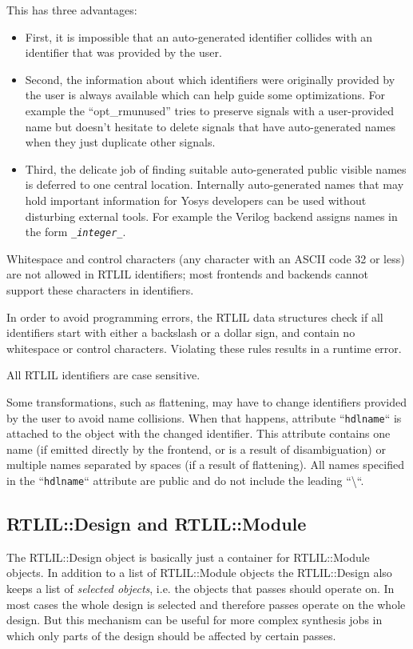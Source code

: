 This has three advantages:

\begin{itemize}
\item First, it is impossible that an auto-generated identifier collides with
an identifier that was provided by the user.
\item Second, the information about which identifiers were originally
provided by the user is always available which can help guide some optimizations. For example the ``opt\_rmunused''
tries to preserve signals with a user-provided name but doesn't hesitate to delete signals that have
auto-generated names when they just duplicate other signals.
\item Third, the delicate job of finding suitable auto-generated public visible
names is deferred to one central location. Internally auto-generated names that
may hold important information for Yosys developers can be used without
disturbing external tools. For example the Verilog backend assigns names in the form {\tt \_{\it integer}\_}.
\end{itemize}

Whitespace and control characters (any character with an ASCII code 32 or less) are not allowed
in RTLIL identifiers; most frontends and backends cannot support these characters in identifiers.

In order to avoid programming errors, the RTLIL data structures check if all identifiers start
with either a backslash or a dollar sign, and contain no whitespace or control characters.
Violating these rules results in a runtime error.

All RTLIL identifiers are case sensitive.

Some transformations, such as flattening, may have to change identifiers provided by the user
to avoid name collisions. When that happens, attribute ``{\tt hdlname}`` is attached to the object
with the changed identifier. This attribute contains one name (if emitted directly by the frontend,
or is a result of disambiguation) or multiple names separated by spaces (if a result of flattening).
All names specified in the ``{\tt hdlname}`` attribute are public and do not include the leading
``\textbackslash``.

\subsection{RTLIL::Design and RTLIL::Module}

The RTLIL::Design object is basically just a container for RTLIL::Module objects. In addition to
a list of RTLIL::Module objects the RTLIL::Design also keeps a list of {\it selected objects}, i.e.
the objects that passes should operate on. In most cases the whole design is selected and therefore
passes operate on the whole design. But this mechanism can be useful for more complex synthesis jobs
in which only parts of the design should be affected by certain passes.


